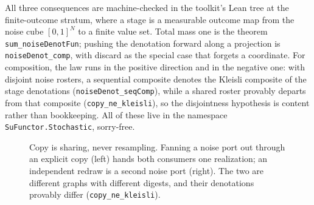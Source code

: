 All three consequences are machine-checked in the toolkit's Lean
tree at the finite-outcome stratum, where a stage is a measurable
outcome map from the noise cube $[0,1]^{N}$ to a finite value set.
Total mass one is the theorem \texttt{sum\_noiseDenotFun}; pushing
the denotation forward along a projection is
\texttt{noiseDenot\_comp}, with discard as the special case that
forgets a coordinate. For
composition, the law runs in the positive direction and in the
negative one: with disjoint noise rosters, a sequential composite
denotes the Kleisli composite of the stage denotations
(\texttt{noiseDenot\_seqComp}), while a shared roster provably
departs from that composite (\texttt{copy\_ne\_kleisli}), so the
disjointness hypothesis is content rather than bookkeeping. All of
these live in the namespace \texttt{SuFunctor.Stochastic},
sorry-free.

\begin{figure}[t]
\centering
{}
\caption{Copy is sharing, never resampling. Fanning a noise port out
through an explicit copy (left) hands both consumers one realization;
an independent redraw is a second noise port (right). The two are
different graphs with different digests, and their denotations
provably differ (\texttt{copy\_ne\_kleisli}).}
\label{fig:mk-copy-resample}
\end{figure}

